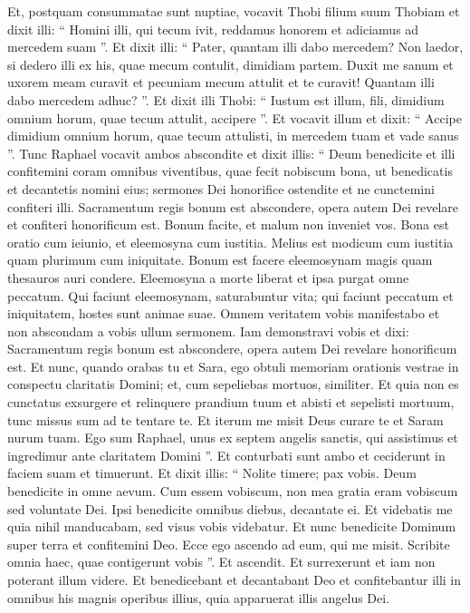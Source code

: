\begin{biblechapter}
\begin{biblechapter}
\begin{biblechapter}
\begin{biblechapter}
\begin{biblechapter}
\begin{biblechapter}
\begin{biblechapter}
\begin{biblechapter}
\begin{biblechapter}
\begin{biblechapter}
\begin{biblechapter}
\begin{biblechapter}
\verse Et, postquam consummatae sunt nuptiae, vocavit Thobi filium suum Thobiam et dixit illi: “ Homini illi, qui tecum ivit, reddamus honorem et adiciamus ad mercedem suam ”. 
\verse Et dixit illi: “ Pater, quantam illi dabo mercedem? Non laedor, si dedero illi ex his, quae mecum contulit, dimidiam partem. 
\verse Duxit me sanum et uxorem meam curavit et pecuniam mecum attulit et te curavit! Quantam illi dabo mercedem adhuc? ”. 
\verse Et dixit illi Thobi: “ Iustum est illum, fili, dimidium omnium horum, quae tecum attulit, accipere ”. 
\verse Et vocavit illum et dixit: “ Accipe dimidium omnium horum, quae tecum attulisti, in mercedem tuam et vade sanus ”. 
\verse Tunc Raphael vocavit ambos abscondite et dixit illis: “ Deum benedicite et illi confitemini coram omnibus viventibus, quae fecit nobiscum bona, ut benedicatis et decantetis nomini eius; sermones Dei honorifice ostendite et ne cunctemini confiteri illi. 
\verse Sacramentum regis bonum est abscondere, opera autem Dei revelare et confiteri honorificum est. Bonum facite, et malum non inveniet vos. 
\verse Bona est oratio cum ieiunio, et eleemosyna cum iustitia. Melius est modicum cum iustitia quam plurimum cum iniquitate. Bonum est facere eleemosynam magis quam thesauros auri condere. 
 \verse Eleemosyna a morte liberat et ipsa purgat omne peccatum. Qui faciunt eleemosynam, saturabuntur vita; 
\verse qui faciunt peccatum et iniquitatem, hostes sunt animae suae. 
\verse Omnem veritatem vobis manifestabo et non abscondam a vobis ullum sermonem. Iam demonstravi vobis et dixi: Sacramentum regis bonum est abscondere, opera autem Dei revelare honorificum est. 
\verse Et nunc, quando orabas tu et Sara, ego obtuli memoriam orationis vestrae in conspectu claritatis Domini; et, cum sepeliebas mortuos, similiter. 
\verse Et quia non es cunctatus exsurgere et relinquere prandium tuum et abisti et sepelisti mortuum, tunc missus sum ad te tentare te. 
\verse Et iterum me misit Deus curare te et Saram nurum tuam. 
\verse Ego sum Raphael, unus ex septem angelis sanctis, qui assistimus et ingredimur ante claritatem Domini ”. 
\verse Et conturbati sunt ambo et ceciderunt in faciem suam et timuerunt. 
\verse Et dixit illis: “ Nolite timere; pax vobis. Deum benedicite in omne aevum. 
\verse Cum essem vobiscum, non mea gratia eram vobiscum sed voluntate Dei. Ipsi benedicite omnibus diebus, decantate ei. 
\verse Et videbatis me quia nihil manducabam, sed visus vobis videbatur. 
\verse Et nunc benedicite Dominum super terra et confitemini Deo. Ecce ego ascendo ad eum, qui me misit. Scribite omnia haec, quae contigerunt vobis ”. Et ascendit. 
\verse Et surrexerunt et iam non poterant illum videre. 
\verse Et benedicebant et decantabant Deo et confitebantur illi in omnibus his magnis operibus illius, quia apparuerat illis angelus Dei.
 

\end{biblechapter}
\end{biblechapter}
\end{biblechapter}
\end{biblechapter}
\end{biblechapter}
\end{biblechapter}
\end{biblechapter}
\end{biblechapter}
\end{biblechapter}
\end{biblechapter}
\end{biblechapter}
\end{biblechapter}
